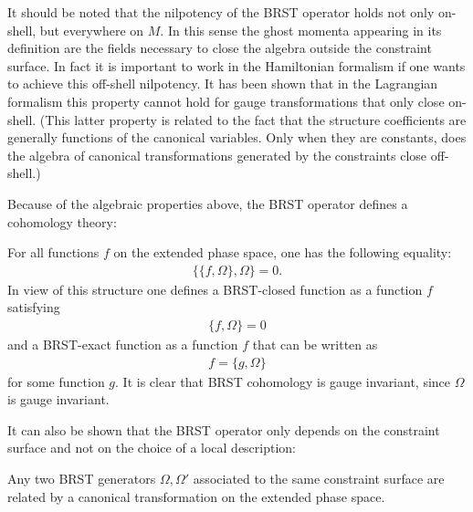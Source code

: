     \begin{remark}
        It should be noted that the nilpotency of the BRST operator holds not only on-shell, but everywhere on $M$. In this sense the ghost momenta appearing in its definition are the fields necessary to close the algebra outside the constraint surface. In fact it is important to work in the Hamiltonian formalism if one wants to achieve this off-shell nilpotency. It has been shown that in the Lagrangian formalism this property cannot hold for gauge transformations that only close on-shell. (This latter property is related to the fact that the structure coefficients are generally functions of the canonical variables. Only when they are constants, does the algebra of canonical transformations generated by the constraints close off-shell.)
    \end{remark}

    Because of the algebraic properties above, the BRST operator defines a cohomology theory:
    \begin{property}
        For all functions $f$ on the extended phase space, one has the following equality:
        \begin{gather}
            \{\{f,\Omega\},\Omega\} = 0.
        \end{gather}
        In view of this structure one defines a BRST-closed function as a function $f$ satisfying
        \begin{gather}
            \{f,\Omega\} = 0
        \end{gather}
        and a BRST-exact function as a function $f$ that can be written as
        \begin{gather}
            f = \{g,\Omega\}
        \end{gather}
        for some function $g$. It is clear that BRST cohomology is gauge invariant, since $\Omega$ is gauge invariant.
    \end{property}
    It can also be shown that the BRST operator only depends on the constraint surface and not on the choice of a local description:
    \begin{property}[Uniqueness]
        Any two BRST generators $\Omega,\Omega'$ associated to the same constraint surface are related by a canonical transformation on the extended phase space.
    \end{property}

